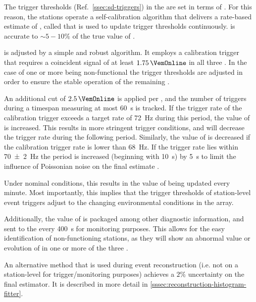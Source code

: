 The trigger thresholds (Ref.\ \cref{ssec:sd-triggers}) in the \WCD are set in
terms of \Ivem. For this reason, the stations operate a self-calibration
algorithm that delivers a rate-based estimate of \Ivem, called \VemOnline that
is used to update trigger thresholds continuously. \VemOnline is accurate to 
$\sim5-10\%$ of the true value of \Ivem 
\cite{bertouCalibrationSurfaceArray2006}.

\VemOnline is adjusted by a simple and robust algorithm. It employs a 
calibration trigger that requires a coincident signal of at least 
$1.75\,\VemOnline$ in all three \LPMTs. In the case of one or more \PMTs
being non-functional the trigger thresholds are adjusted in order to ensure 
the stable operation of the remaining \PMTs 
\cite{convengaLocalStationCalibrationDummies2023}.

An additional cut of $2.5\,\VemOnline$ is applied per \LPMT, and the number 
of triggers during a timespan measuring at most \SI{60}{\second} is tracked. If
the trigger rate of the calibration trigger exceeds a target rate of 
\SI{72}{\hertz} during this period, the value of \VemOnline is increased. This 
results in more stringent trigger conditions, and will decrease the trigger 
rate during the following \DAQ period. Similarly, the value of \VemOnline is 
decreased if the calibration trigger rate is lower than \SI{68}{\hertz}. If the
trigger rate lies within \SI{70\pm2}{\hertz} the \DAQ period is increased 
(beginning with \SI{10}{\second}) by \SI{5}{\second} to limit the influence of 
Poissonian noise on the final estimate \cite{bertouCalibrationSurfaceArray2006,
convengaLocalStationCalibrationDummies2023}.

Under nominal conditions, this results in the value of \VemOnline being updated
every minute. Most importantly, this implies that the trigger thresholds of 
station-level event triggers adjust to the changing environmental conditions in
the array. 

Additionally, the value of \VemOnline is packaged among other diagnostic 
information, and sent to the \CDAS every \SI{400}{\second} for monitoring 
purposes. This allows for the easy identification of non-functioning stations, 
as they will show an abnormal value or evolution of \VemOnline in one or more 
of the three \LPMTs. 

An alternative method that is used during event reconstruction (i.e. not on a 
station-level for trigger/monitoring purposes) achieves a $2\%$ uncertainty on 
the final estimator. It is described in more detail in 
\cref{sssec:reconstruction-histogram-fitter}.

